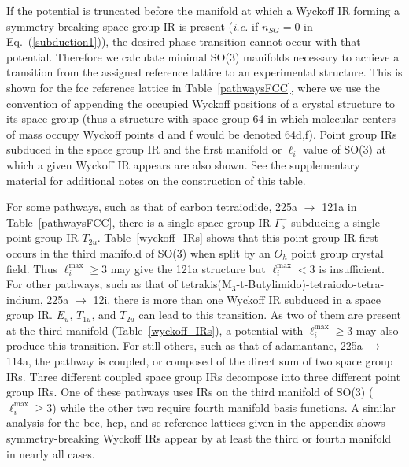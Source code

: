 \documentclass[preprint]{iucr}              %
\begin{document}
If the potential is truncated before the manifold at which a Wyckoff
IR forming a symmetry-breaking space group IR is present
(\emph{i.e.} if $n_{SG}=0$ in Eq.~(\ref{subduction1})), the desired
phase transition cannot occur with that potential. Therefore we
calculate minimal SO(3) manifolds necessary to achieve a transition
from the assigned reference lattice to an experimental structure.
This is shown for the fcc reference lattice in Table~\ref{pathwaysFCC}, where we
use the convention of appending the occupied Wyckoff positions of a crystal
structure to its space group (thus a structure with space group 64 in which
molecular centers of mass occupy Wyckoff points d and f would be denoted 64d,f).
Point group IRs subduced in the space group IR and the first
manifold or $\ell_i$ value of SO(3) at which a given Wyckoff IR appears are also
shown.  See the supplementary material for additional notes on the construction
of this table.

For some pathways, such as that of carbon tetraiodide, 225a
$\rightarrow$ 121a in Table~\ref{pathwaysFCC}, there is a single
space group IR $\Gamma_5^-$ subducing a single point group IR
$T_{2u}$. Table~\ref{wyckoff_IRs} shows that this point group IR
first occurs in the third manifold of SO(3) when split by an $O_h$
point group crystal field.  Thus $\ell_i^{\mathrm{max}}\geq 3$ may
give the 121a structure but $\ell_i^{\mathrm{max}} < 3$ is insufficient. For
other pathways, such as that of
tetrakis(M$_3$-t-Butylimido)-tetraiodo-tetra-indium, 225a
$\rightarrow$ 12i, there is more than
one Wyckoff IR subduced in a space group IR. $E_u$, $T_{1u}$, and
$T_{2u}$ can lead to this transition. As two of them are present at the
third manifold (Table~\ref{wyckoff_IRs}), a potential with
$\ell_i^{\mathrm{max}}\geq 3$ may also produce this transition. For still
others, such as that of adamantane,
225a $\rightarrow$ 114a, the pathway is
coupled, or composed of the direct sum of two space group IRs.
Three different coupled space group IRs decompose into three
different point group IRs. One of these pathways uses IRs on the
third manifold of SO(3) ($\ell^{\mathrm{max}}_i\geq 3$) while the
other two require fourth manifold basis functions. A similar analysis
for the bcc, hcp, and sc reference
lattices given in the appendix shows symmetry-breaking
Wyckoff IRs appear by at least the third or fourth manifold in
nearly all cases.
\end{document}
